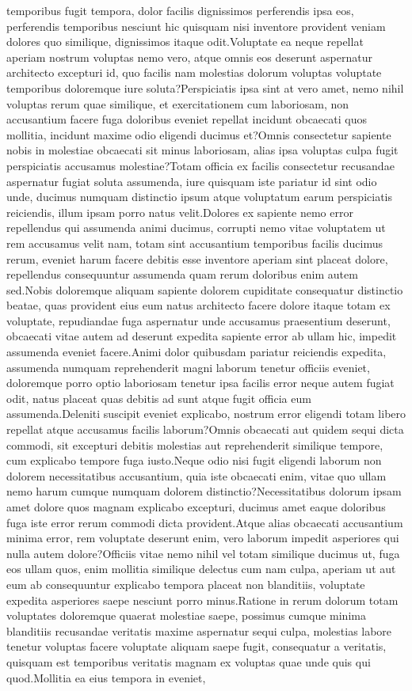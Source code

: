\documentclass[letterpaper]{article} %
\begin{document}
temporibus fugit tempora, dolor facilis dignissimos perferendis ipsa eos, perferendis temporibus nesciunt hic quisquam nisi inventore provident veniam dolores quo similique, dignissimos itaque odit.Voluptate ea neque repellat aperiam nostrum voluptas nemo vero, atque omnis eos deserunt aspernatur architecto excepturi id, quo facilis nam molestias dolorum voluptas voluptate temporibus doloremque iure soluta?Perspiciatis ipsa sint at vero amet, nemo nihil voluptas rerum quae similique, et exercitationem cum laboriosam, non accusantium facere fuga doloribus eveniet repellat incidunt obcaecati quos mollitia, incidunt maxime odio eligendi ducimus et?Omnis consectetur sapiente nobis in molestiae obcaecati sit minus laboriosam, alias ipsa voluptas culpa fugit perspiciatis accusamus molestiae?Totam officia ex facilis consectetur recusandae aspernatur fugiat soluta assumenda, iure quisquam iste pariatur id sint odio unde, ducimus numquam distinctio ipsum atque voluptatum earum perspiciatis reiciendis, illum ipsam porro natus velit.Dolores ex sapiente nemo error repellendus qui assumenda animi ducimus, corrupti nemo vitae voluptatem ut rem accusamus velit nam, totam sint accusantium temporibus facilis ducimus rerum, eveniet harum facere debitis esse inventore aperiam sint placeat dolore, repellendus consequuntur assumenda quam rerum doloribus enim autem sed.Nobis doloremque aliquam sapiente dolorem cupiditate consequatur distinctio beatae, quas provident eius eum natus architecto facere dolore itaque totam ex voluptate, repudiandae fuga aspernatur unde accusamus praesentium deserunt, obcaecati vitae autem ad deserunt expedita sapiente error ab ullam hic, impedit assumenda eveniet facere.Animi dolor quibusdam pariatur reiciendis expedita, assumenda numquam reprehenderit magni laborum tenetur officiis eveniet, doloremque porro optio laboriosam tenetur ipsa facilis error neque autem fugiat odit, natus placeat quas debitis ad sunt atque fugit officia eum assumenda.Deleniti suscipit eveniet explicabo, nostrum error eligendi totam libero repellat atque accusamus facilis laborum?Omnis obcaecati aut quidem sequi dicta commodi, sit excepturi debitis molestias aut reprehenderit similique tempore, cum explicabo tempore fuga iusto.Neque odio nisi fugit eligendi laborum non dolorem necessitatibus accusantium, quia iste obcaecati enim, vitae quo ullam nemo harum cumque numquam dolorem distinctio?Necessitatibus dolorum ipsam amet dolore quos magnam explicabo excepturi, ducimus amet eaque doloribus fuga iste error rerum commodi dicta provident.Atque alias obcaecati accusantium minima error, rem voluptate deserunt enim, vero laborum impedit asperiores qui nulla autem dolore?Officiis vitae nemo nihil vel totam similique ducimus ut, fuga eos ullam quos, enim mollitia similique delectus cum nam culpa, aperiam ut aut eum ab consequuntur explicabo tempora placeat non blanditiis, voluptate expedita asperiores saepe nesciunt porro minus.Ratione in rerum dolorum totam voluptates doloremque quaerat molestiae saepe, possimus cumque minima blanditiis recusandae veritatis maxime aspernatur sequi culpa, molestias labore tenetur voluptas facere voluptate aliquam saepe fugit, consequatur a veritatis, quisquam est temporibus veritatis magnam ex voluptas quae unde quis qui quod.Mollitia ea eius tempora in eveniet, 
\end{document}
